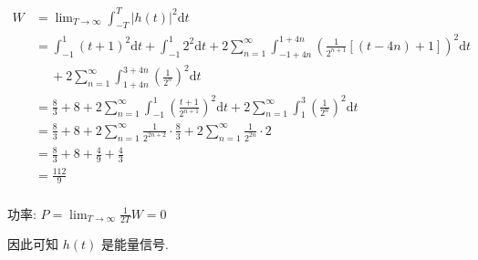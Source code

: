 \documentclass[a4paper,UTF8]{article}
\numberwithin{equation}{section}
\begin{document}
\begin{framed}
\begin{spacing}{1.5}
\begin{itemize}
      $
      \begin{aligned}
      W &= \lim_{T \to \infty}\int_{-T}^{T}|h(t)|^{2}\mathrm{d}t \\
      &= \int_{-1}^{1}(t+1)^{2}\mathrm{d}t + \int_{-1}^{1}2^{2}\mathrm{d}t + 2\sum_{n=1}^{\infty}\int_{-1+4n}^{1+4n}(\frac{1}{2^{n+1}}[(t - 4n)+1])^{2}\mathrm{d}t  \\
      &\quad\ + 2\sum_{n=1}^{\infty}\int_{1+4n}^{3+4n}(\frac{1}{2^{n}})^{2}\mathrm{d}t \\
      &= \frac{8}{3} + 8 + 2\sum_{n=1}^{\infty}\int_{-1}^{1}(\frac{t+1}{2^{n+1}})^{2}\mathrm{d}t + 2\sum_{n=1}^{\infty}\int_{1}^{3}(\frac{1}{2^{n}})^{2}\mathrm{d}t \\
      &= \frac{8}{3} + 8 + 2\sum_{n=1}^{\infty}\frac{1}{2^{2n+2}}\cdot \frac{8}{3} + 2\sum_{n=1}^{\infty}\frac{1}{2^{2n}}\cdot 2 \\
      &= \frac{8}{3} + 8 + \frac{4}{9} + \frac{4}{3} \\
      &= \frac{112}{9} \\
      \end{aligned}
      $
      
      功率: $\displaystyle P = \lim_{T \to \infty}\frac{1}{2T}W = 0$
      
      因此可知 $h(t)$ 是能量信号.
    \end{itemize}
\end{spacing}
\end{framed}


\newpage
\end{document}
